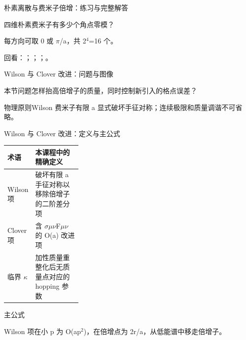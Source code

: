 \begin{frame}[t]{朴素离散与费米子倍增：练习与完整解答}
\footnotesize
\begin{block}{}四维朴素费米子有多少个角点零模？\end{block}
\begin{exampleblock}{}每方向可取 0 或 \ensuremath{\pi}/\allowbreak{}a，共 2\ensuremath{^{4}}=16 个。\end{exampleblock}
\vfill
\scriptsize 回看：；；；。
\end{frame}

\begin{frame}[t]{Wilson 与 Clover 改进：问题与图像}
\footnotesize
\begin{block}{本节问题}怎样抬高倍增子的质量，同时控制新引入的格点误差？\end{block}
\begin{block}{物理原则}\quad Wilson 费米子有限 a 显式破坏手征对称；连续极限和质量调谐不可省略。\end{block}
\end{frame}

\begin{frame}[t]{Wilson 与 Clover 改进：定义与主公式}
\footnotesize\begin{tabularx}{\linewidth}{p{0.30\linewidth}Y}
\toprule 术语 & 本课程中的精确定义\\\midrule
{} Wilson 项 & 破坏有限 a 手征对称以移除倍增子的二阶差分项\\
 Clover 项 & 含 \ensuremath{\sigma}\ensuremath{\mu}\ensuremath{\nu}F\ensuremath{\mu}\ensuremath{\nu} 的 O(a) 改进项\\
 临界 \ensuremath{\kappa} & 加性质量重整化后无质量点对应的 hopping 参数\\
\bottomrule\end{tabularx}\vspace{0.15cm}
\begin{block}{ 主公式}\centering{}\end{block}
Wilson 项在小 p 为 O(ap\ensuremath{^{2}})，在倍增点为 2r/\allowbreak{}a，从低能谱中移走倍增子。
\end{frame}

